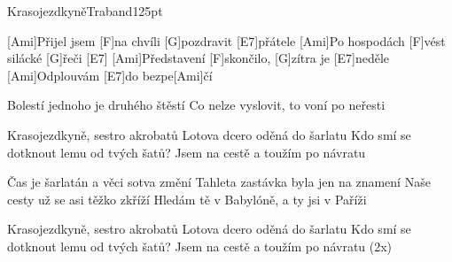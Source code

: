 \begin{song}{Krasojezdkyně}{Traband}{125pt}

%
[Ami]Přijel jsem [F]na chvíli [G]pozdravit [E7]přátele
[Ami]Po hospodách [F]vést silácké [G]{}řeči [E7]{}
[Ami]Představení [F]skončilo, [G]zítra je [E7]neděle
[Ami]Odplouvám [E7]do bezpe[Ami]{}čí

Bolestí jednoho je druhého štěstí
Co nelze vyslovit, to voní po neřesti

\chorus%
Krasojezdkyně, sestro akrobatů
Lotova dcero oděná do šarlatu
Kdo smí se dotknout lemu od tvých šatů?
Jsem na cestě a toužím po návratu

%
Čas je šarlatán a věci sotva změní
Tahleta zastávka byla jen na znamení
Naše cesty už se asi těžko zkříží
Hledám tě v Babylóně, a ty jsi v Paříži

\chorus%
Krasojezdkyně, sestro akrobatů
Lotova dcero oděná do šarlatu
Kdo smí se dotknout lemu od tvých šatů?
Jsem na cestě a toužím po návratu
(2x)
\end{song}
